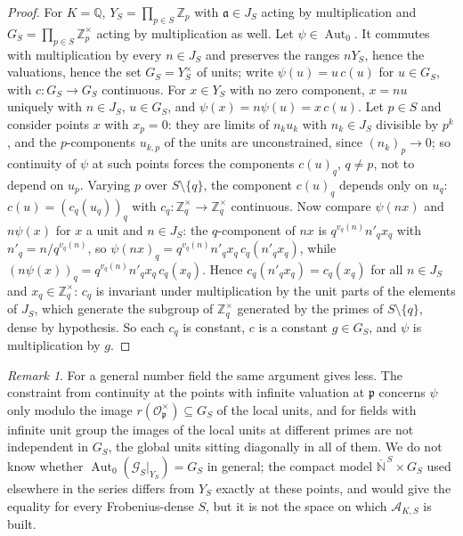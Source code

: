 \documentclass[11pt]{amsart}
\numberwithin{equation}{section}
\theoremstyle{definition}
\theoremstyle{remark}
\newtheorem{remark}[theorem]{Remark}
\newcommand{\Z}{\mathbb{Z}}
\newcommand{\Q}{\mathbb{Q}}
\newcommand{\N}{\mathbb{N}}
\newcommand{\cA}{\mathcal{A}}
\newcommand{\cG}{\mathcal{G}}
\newcommand{\cO}{\mathcal{O}}
\newcommand{\pp}{\mathfrak{p}}
\newcommand{\aaa}{\mathfrak{a}}
\begin{document}
\begin{proof}
For $K=\Q$, $Y_S=\prod_{p\in S}\Z_p$ with $\aaa\in J_S$ acting by multiplication and
$G_S=\prod_{p\in S}\Z_p^\times$ acting by multiplication as well. Let $\psi\in\operatorname{Aut}_0$.
It commutes with multiplication by every $n\in J_S$ and preserves the ranges $nY_S$, hence
the valuations, hence the set $G_S=Y_S^\times$ of units; write $\psi(u)=u\,c(u)$ for
$u\in G_S$, with $c:G_S\to G_S$ continuous. For $x\in Y_S$ with no zero component, $x=nu$
uniquely with $n\in J_S$, $u\in G_S$, and $\psi(x)=n\psi(u)=x\,c(u)$. Let $p\in S$ and
consider points $x$ with $x_p=0$: they are limits of $n_ku_k$ with $n_k\in J_S$ divisible by
$p^k$, and the $p$-components $u_{k,p}$ of the units are unconstrained, since
$(n_k)_p\to0$; so continuity of $\psi$ at such points forces the components $c(u)_q$, $q\ne p$,
not to depend on $u_p$. Varying $p$ over $S\setminus\{q\}$, the component $c(u)_q$ depends
only on $u_q$: $c(u)=(c_q(u_q))_q$ with $c_q:\Z_q^\times\to\Z_q^\times$ continuous. Now
compare $\psi(nx)$ and $n\psi(x)$ for $x$ a unit and $n\in J_S$: the $q$-component of $nx$ is
$q^{v_q(n)}n'_qx_q$ with $n'_q=n/q^{v_q(n)}$, so $\psi(nx)_q=q^{v_q(n)}n'_qx_q\,c_q(n'_qx_q)$,
while $(n\psi(x))_q=q^{v_q(n)}n'_qx_q\,c_q(x_q)$. Hence $c_q(n'_qx_q)=c_q(x_q)$ for all
$n\in J_S$ and $x_q\in\Z_q^\times$: $c_q$ is invariant under multiplication by the unit parts
of the elements of $J_S$, which generate the subgroup of $\Z_q^\times$ generated by the
primes of $S\setminus\{q\}$, dense by hypothesis. So each $c_q$ is constant, $c$ is a constant
$g\in G_S$, and $\psi$ is multiplication by $g$.
\end{proof}

\begin{remark}\label{rem:autgeneral}
For a general number field the same argument gives less. The constraint from continuity
at the points with infinite valuation at $\pp$ concerns $\psi$ only modulo the image
$r(\cO_\pp^\times)\subseteq G_S$ of the local units, and for fields with infinite unit group
the images of the local units at different primes are not independent in $G_S$, the global
units sitting diagonally in all of them. We do not know whether
$\operatorname{Aut}_0(\cG_S|_{Y_S})=G_S$ in general; the compact model $\overline{\N}^{\,S}\times G_S$
used elsewhere in the series differs from $Y_S$ exactly at these points, and would give the
equality for every Frobenius-dense $S$, but it is not the space on which $\cA_{K,S}$ is built.
\end{remark}
\end{document}
